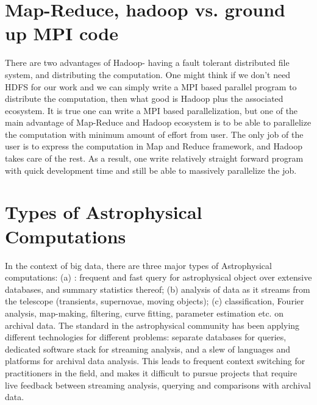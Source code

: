 \documentclass{tufte-handout}
\begin{document}
\section{Map-Reduce, hadoop vs. ground up MPI code}
There are two advantages of Hadoop- having a fault tolerant distributed file system, and distributing the computation. One might think if we don't need HDFS for our work and we can simply write a MPI based parallel program to distribute the computation, then what good is Hadoop plus the associated ecosystem. It is true one can write a MPI based parallelization, but one of the main advantage of  Map-Reduce and Hadoop ecosystem is to be able to parallelize the computation with minimum amount of effort from user. The only job of the user is to express the computation in Map and Reduce framework, and Hadoop takes care of the rest. As a result, one write relatively straight forward program with quick development time and still be able to massively parallelize the job.


\section{Types of Astrophysical Computations}
In the context of big data, there are three major types of Astrophysical computations: (a) : frequent and fast query for astrophysical object over extensive databases, and summary statistics thereof; 
(b)   analysis of data as it streams from the telescope
(transients, supernovae, moving objects); (c)  classification, Fourier analysis, 
map-making, filtering, curve fitting, parameter estimation etc. on archival data. The standard in the astrophysical community has been applying different technologies for different problems: separate databases for queries, dedicated software stack for streaming analysis, and a slew of languages and platforms for archival data analysis.  This leads to frequent context switching for practitioners in the field, and makes it difficult to pursue projects that require live feedback between streaming analysis, querying and comparisons with archival data.  
\end{document}

